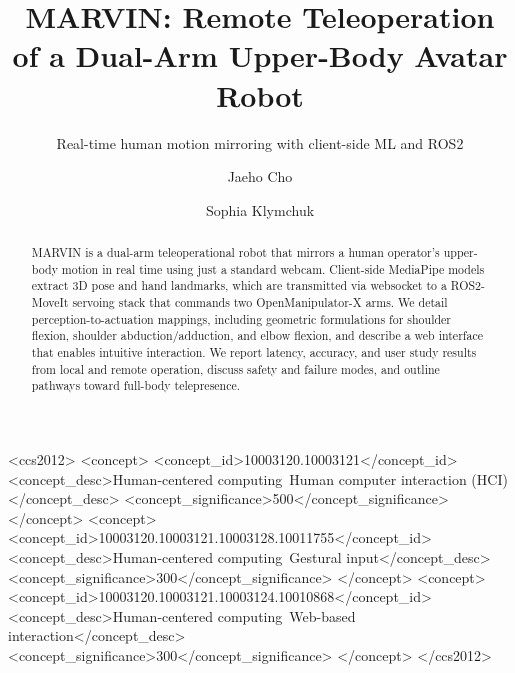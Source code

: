 \documentclass[manuscript,screen]{acmart} %
\begin{document}
\title{MARVIN: Remote Teleoperation of a Dual-Arm Upper-Body Avatar Robot}
\subtitle{Real-time human motion mirroring with client-side ML and ROS2}

\author{Jaeho Cho}
\author{Sophia Klymchuk}
\authornotemark[1]

\renewcommand{\shortauthors}{Last}

\begin{abstract}
MARVIN is a dual-arm teleoperational robot that mirrors a human 
operator's upper-body motion in real time using just a standard webcam. 
Client-side MediaPipe models extract 3D pose and hand landmarks, which are 
transmitted via websocket to a ROS2-MoveIt servoing stack that commands two 
OpenManipulator-X arms. We detail perception-to-actuation mappings, including 
geometric formulations for shoulder flexion, shoulder abduction/adduction, and 
elbow flexion, and describe a web interface that enables intuitive interaction. 
We report latency, accuracy, and user study results from local and remote 
operation, discuss safety and failure modes, and outline pathways toward 
full-body telepresence. %
\end{abstract}

\begin{CCSXML}
<ccs2012>
   <concept>
       <concept_id>10003120.10003121</concept_id>
       <concept_desc>Human-centered computing~Human computer interaction (HCI)</concept_desc>
       <concept_significance>500</concept_significance>
       </concept>
   <concept>
       <concept_id>10003120.10003121.10003128.10011755</concept_id>
       <concept_desc>Human-centered computing~Gestural input</concept_desc>
       <concept_significance>300</concept_significance>
       </concept>
   <concept>
       <concept_id>10003120.10003121.10003124.10010868</concept_id>
       <concept_desc>Human-centered computing~Web-based interaction</concept_desc>
       <concept_significance>300</concept_significance>
       </concept>
 </ccs2012>
\end{CCSXML}
\end{document}

